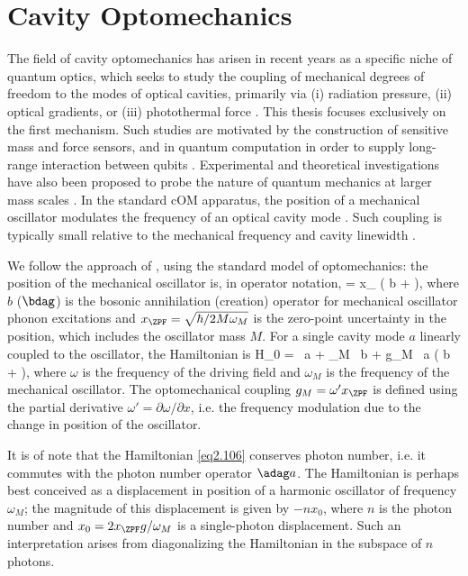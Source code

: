 \section{Cavity Optomechanics}
The field of cavity optomechanics has arisen in recent years as a specific niche of quantum optics, which seeks to study the coupling of mechanical degrees of freedom to the modes of optical cavities, primarily via (i) radiation pressure, (ii) optical gradients, or (iii) photothermal force \cite{girvin2011}. This thesis focuses exclusively on the first mechanism. Such studies are motivated by the construction of sensitive mass and force sensors, and in quantum computation in order to supply long-range interaction between qubits \cite{girvin2011}. Experimental and theoretical investigations have also been proposed to probe the nature of quantum mechanics at larger mass scales \cite{corbitt2007, girvin2011}. In the standard cOM apparatus, the position of a mechanical oscillator modulates the frequency of an optical cavity mode \cite{girvin2011}. Such coupling is typically small relative to the mechanical frequency and cavity linewidth \cite{girvin2011}.

We follow the approach of \cite{girvin2011}, using the standard model of optomechanics: the position of the mechanical oscillator is, in operator notation,
%
\be {} = x_{\ZPF} \left( b + \bdag \right), \label{eq2.105} \ee
%
where $b$ ($\bdag$) is the bosonic annihilation (creation) operator for mechanical oscillator phonon excitations and $x_{\ZPF} = \sqrt{\hbar/2M\omega_M}$ is the zero-point uncertainty in the position, which includes the oscillator mass $M$. For a single cavity mode $a$ linearly coupled to the oscillator, the Hamiltonian is
%
\be H_0 = \hbar\omega \, \adag a + \hbar\omega_M \, \bdag b + g_M \, \adag a \left( b + \bdag \right), \label{eq2.106} \ee
%
where $\omega$ is the frequency of the driving field and $\omega_M$ is the frequency of the mechanical oscillator. The optomechanical coupling $g_M = \omega' x_{\ZPF}$ is defined using the partial derivative $\omega' = \partial\omega/\partial x$, i.e. the frequency modulation due to the change in position of the oscillator.

It is of note that the Hamiltonian \eqref{eq2.106} conserves photon number, i.e. it commutes with the photon number operator $\adag a$. The Hamiltonian is perhaps best conceived as a displacement in position of a harmonic oscillator of frequency $\omega_M$; the magnitude of this displacement is given by $-nx_0$, where $n$ is the photon number and $x_0 = 2x_{\ZPF}g/\omega_M$ is a single-photon displacement. Such an interpretation arises from diagonalizing the Hamiltonian in the subspace of $n$ photons.

